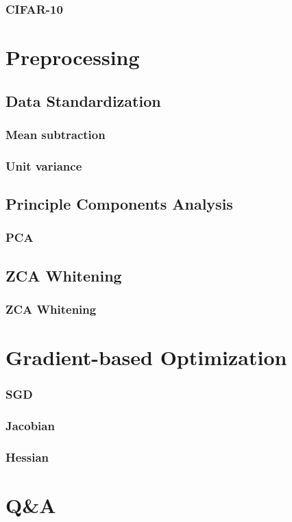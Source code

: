 \documentclass{beamer}
\begin{document}
\begin{frame}
    \frametitle{CIFAR-10}
\end{frame}

\section{Preprocessing}

\subsection{Data Standardization}

\begin{frame}
    \frametitle{Mean subtraction}
\end{frame}

\begin{frame}
    \frametitle{Unit variance}
\end{frame}

\subsection{Principle Components Analysis}

\begin{frame}
    \frametitle{PCA}
\end{frame}

\subsection{ZCA Whitening}

\begin{frame}
    \frametitle{ZCA Whitening}
\end{frame}

\section{Gradient-based Optimization}

\begin{frame}
    \frametitle{SGD}
\end{frame}

\begin{frame}
    \frametitle{Jacobian}
\end{frame}

\begin{frame}
    \frametitle{Hessian}
\end{frame}

\section{Q\&A}
\end{document}
